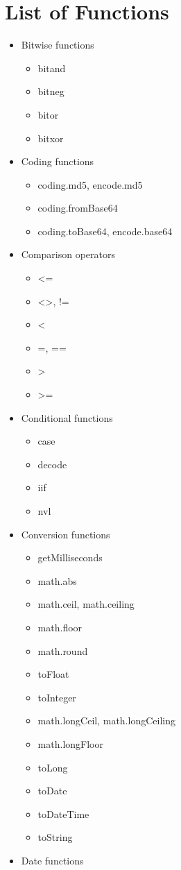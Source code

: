 \section{List of Functions}
\begin{itemize}
    \item Bitwise functions
    \begin{itemize}
        \item bitand
        \item bitneg
        \item bitor
        \item bitxor
    \end{itemize}
    \item Coding functions
    \begin{itemize}
        \item coding.md5, encode.md5
        \item coding.fromBase64
        \item coding.toBase64, encode.base64
    \end{itemize}
    \item Comparison operators
    \begin{itemize}
        \item <=
        \item <>, !=
        \item <
        \item =, ==
        \item >
        \item >=
    \end{itemize}
    \item Conditional functions
    \begin{itemize}
        \item case
        \item decode
        \item iif
        \item nvl
    \end{itemize}
    \item Conversion functions
    \begin{itemize}

        \item getMilliseconds
        \item math.abs
        \item math.ceil, math.ceiling
        \item math.floor
        \item math.round
        \item toFloat
        \item toInteger
        \item math.longCeil, math.longCeiling
        \item math.longFloor
        \item toLong
        \item toDate
        \item toDateTime
        \item toString
    \end{itemize}
    \item Date functions
    \begin{itemize}


\end{itemize}
\end{itemize}

